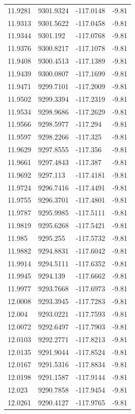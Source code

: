 \begin{table}[H]
\begin{tabular}{llll}
11.9281 & 9301.9324 & -117.0148 & -9.81 \\
11.9313 & 9301.5622 & -117.0458 & -9.81 \\
11.9344 & 9301.192 & -117.0768 & -9.81 \\
11.9376 & 9300.8217 & -117.1078 & -9.81 \\
11.9408 & 9300.4513 & -117.1389 & -9.81 \\
11.9439 & 9300.0807 & -117.1699 & -9.81 \\
11.9471 & 9299.7101 & -117.2009 & -9.81 \\
11.9502 & 9299.3394 & -117.2319 & -9.81 \\
11.9534 & 9298.9686 & -117.2629 & -9.81 \\
11.9566 & 9298.5977 & -117.294 & -9.81 \\
11.9597 & 9298.2266 & -117.325 & -9.81 \\
11.9629 & 9297.8555 & -117.356 & -9.81 \\
11.9661 & 9297.4843 & -117.387 & -9.81 \\
11.9692 & 9297.113 & -117.4181 & -9.81 \\
11.9724 & 9296.7416 & -117.4491 & -9.81 \\
11.9755 & 9296.3701 & -117.4801 & -9.81 \\
11.9787 & 9295.9985 & -117.5111 & -9.81 \\
11.9819 & 9295.6268 & -117.5421 & -9.81 \\
11.985 & 9295.255 & -117.5732 & -9.81 \\
11.9882 & 9294.8831 & -117.6042 & -9.81 \\
11.9914 & 9294.5111 & -117.6352 & -9.81 \\
11.9945 & 9294.139 & -117.6662 & -9.81 \\
11.9977 & 9293.7668 & -117.6973 & -9.81 \\
12.0008 & 9293.3945 & -117.7283 & -9.81 \\
12.004 & 9293.0221 & -117.7593 & -9.81 \\
12.0072 & 9292.6497 & -117.7903 & -9.81 \\
12.0103 & 9292.2771 & -117.8213 & -9.81 \\
12.0135 & 9291.9044 & -117.8524 & -9.81 \\
12.0167 & 9291.5316 & -117.8834 & -9.81 \\
12.0198 & 9291.1587 & -117.9144 & -9.81 \\
12.023 & 9290.7858 & -117.9454 & -9.81 \\
12.0261 & 9290.4127 & -117.9765 & -9.81 \\

\end{tabular}
\end{table}
